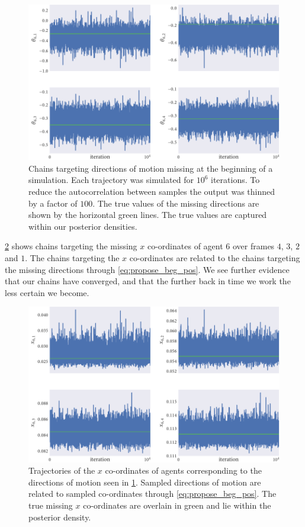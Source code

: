 \begin{figure}[tbp]
  \includegraphics{beg/dir_trace.pdf}
  \caption{Chains targeting directions of motion missing at the beginning of a
  simulation. Each trajectory was simulated for $10^6$ iterations. To reduce
  the autocorrelation between samples the output was thinned by a factor of
  $100$. The true values of the missing directions are shown by the horizontal
  green lines. The true values are captured within our posterior densities.}
  \label{fig:beg_dir_trace}
\end{figure}

\cref{fig:beg_x_trace} shows chains targeting the missing $x$ co-ordinates of
agent $6$ over frames $4$, $3$, $2$ and $1$. The chains targeting the $x$
co-ordinates are related to the chains targeting the missing directions through
\cref{eq:propose_beg_pos}. We see further evidence that our chains have
converged, and that the further back in time we work the less certain we become.

\begin{figure}[tbp]
  \includegraphics{beg/x_trace.pdf}
  \caption{Trajectories of the $x$ co-ordinates of agents corresponding to the
  directions of motion seen in \cref{fig:beg_dir_trace}. Sampled directions of
  motion are related to sampled co-ordinates through \cref{eq:propose_beg_pos}.
  The true missing $x$ co-ordinates are overlain in green and lie within the
  posterior density.}
  \label{fig:beg_x_trace}
\end{figure}


